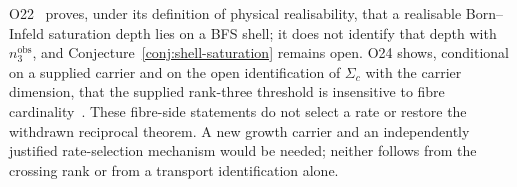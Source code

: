 \documentclass[11pt,a4paper]{article}
\theoremstyle{definition}
\theoremstyle{remark}
\begin{document}
  O22~\cite{Beau2026a26} proves, under its definition of physical
  realisability, that a realisable Born--Infeld saturation depth lies on a
  BFS shell; it does not identify that depth with $n_3^{\mathrm{obs}}$, and
  Conjecture~\ref{conj:shell-saturation} remains open.
  O24 shows,
  conditional on a supplied carrier and on the open identification of
  $\Sigma_c$ with the carrier dimension, that the supplied rank-three
  threshold is insensitive to fibre cardinality~\cite{Beau2026a28}.
  These fibre-side statements do not select a rate or restore the withdrawn reciprocal theorem.
  A new growth carrier and an independently justified rate-selection mechanism would be needed;
  neither follows from the crossing rank or from a transport identification alone.


  
      
\end{document}
